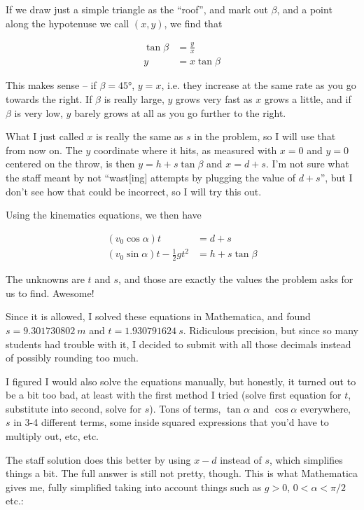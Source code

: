 \documentclass[8.01x]{subfiles}
\begin{document}
If we draw just a simple triangle as the ``roof'', and mark out $\beta$, and a point along the hypotenuse we call $(x, y)$, we find that

\begin{align}
\tan \beta &= \frac{y}{x}\\
y &= x \tan \beta
\end{align}

This makes sense -- if $\beta = \ang{45}$, $y = x$, i.e. they increase at the same rate as you go towards the right. If $\beta$ is really large, $y$ grows very fast as $x$ grows a little, and if $\beta$ is very low, $y$ barely grows at all as you go further to the right.

What I just called $x$ is really the same as $s$ in the problem, so I will use that from now on. The $y$ coordinate where it hits, as measured with $x = 0$ and $y = 0$ centered on the throw, is then $y = h + s \tan \beta$ and $x = d + s$. I'm not sure what the staff meant by not ``wast[ing] attempts by plugging the value of $d+s$'', but I don't see how that could be incorrect, so I will try this out.

Using the kinematics equations, we then have

\begin{align}
(v_0 \cos \alpha) t &= d + s\\
(v_0 \sin \alpha) t - \frac{1}{2} g t^2 &= h + s \tan \beta
\end{align}

The unknowns are $t$ and $s$, and those are exactly the values the problem asks for us to find. Awesome!

Since it is allowed, I solved these equations in Mathematica, and found $s = \SI{9.301730802}{m}$ and $t = \SI{1.930791624}{s}$. Ridiculous precision, but since so many students had trouble with it, I decided to submit with all those decimals instead of possibly rounding too much.

I figured I would also solve the equations manually, but honestly, it turned out to be a bit too bad, at least with the first method I tried (solve first equation for $t$, substitute into second, solve for $s$). Tons of terms, $\tan \alpha$ and $\cos \alpha$ everywhere, $s$ in 3-4 different terms, some inside squared expressions that you'd have to multiply out, etc, etc.

The staff solution does this better by using $x - d$ instead of $s$, which simplifies things a bit. The full answer is still not pretty, though. This is what Mathematica gives me, fully simplified taking into account things such as $g > 0$, $0 < \alpha < \pi/2$ etc.:
\end{document}
